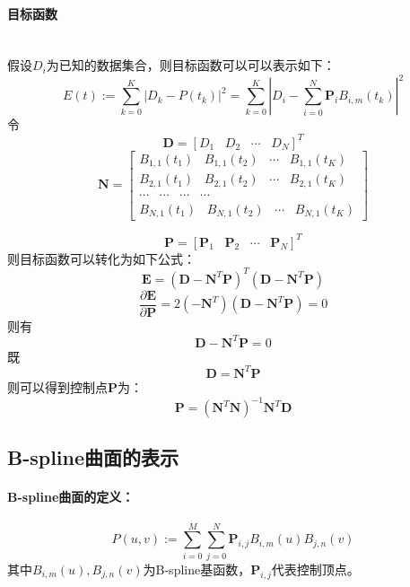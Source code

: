 \documentclass[10pt]{article}
\begin{document}
\paragraph{目标函数}\mbox{}\\
假设$D_i$为已知的数据集合，则目标函数可以可以表示如下：
$$E(t):=\sum_{k=0}^{K}|D_k-P(t_k)|^2=\sum_{k=0}^K|D_i-\sum_{i=0}^N\bm{P}_iB_{i,m}(t_k)|^2$$
令
$$\bm{D}=\left[D_1 \hspace{10pt} D_2 \hspace{10pt} \cdots \hspace{10pt} D_N\right] ^T$$
$$\bm{N}=
\left[
\begin{array}{cccc}
B_{1,1}(t_1) \hspace{10pt} B_{1,1}(t_2) \hspace{10pt} \cdots \hspace{10pt} B_{1,1}(t_K) \\
B_{2,1}(t_1) \hspace{10pt} B_{2,1}(t_2) \hspace{10pt} \cdots \hspace{10pt} B_{2,1}(t_K)\\
\cdots \hspace{10pt} \cdots \hspace{10pt} \cdots \hspace{10pt} \cdots \\
B_{N,1}(t_1) \hspace{10pt} B_{N,1}(t_2) \hspace{10pt} \cdots \hspace{10pt} B_{N,1}(t_K)
\end{array}
\right]
$$

$$\bm{P}=
\left[
\bm{P}_1 \hspace{10pt} \bm{P}_2 \hspace{10pt} \cdots \hspace{10pt} \bm{P}_N
\right]^T
$$
则目标函数可以转化为如下公式：
$$\bm{E}=(\bm{D}-\bm{N}^T\bm{P})^T(\bm{D}-\bm{N}^T\bm{P})$$
$$\frac{\partial{\bm{E}}}{\partial{\bm{P}}}=2(-\bm{N}^T)(\bm{D}-\bm{N}^T\bm{P})=0$$
则有
$$\bm{D}-\bm{N}^T\bm{P}=0$$
既
$$\bm{D}=\bm{N}^T\bm{P}$$
则可以得到控制点$\bm{P}$为：
$$\bm{P}=(\bm{N}^T\bm{N})^{-1}\bm{N}^T\bm{D}$$
\subsection{B-spline曲面的表示}
\paragraph{B-spline曲面的定义：}
$$P(u,v):=\sum_{i=0}^{M}\sum_{j=0}^{N}\bm{P}_{i,j}B_{i,m}(u)B_{j,n}(v)$$
其中$B_{i,m}(u),B_{j,n}(v)$为B-spline基函数，$\bm{P}_{i,j}$代表控制顶点。
\end{document}

